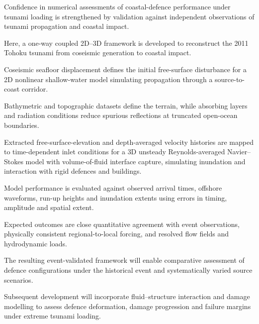 Confidence in numerical assessments of coastal-defence performance under tsunami loading is strengthened by validation against independent observations of tsunami propagation and coastal impact.

Here, a one-way coupled 2D--3D framework is developed to reconstruct the 2011 Tohoku tsunami from coseismic generation to coastal impact.

Coseismic seafloor displacement defines the initial free-surface disturbance for a 2D nonlinear shallow-water model simulating propagation through a source-to-coast corridor.

Bathymetric and topographic datasets define the terrain, while absorbing layers and radiation conditions reduce spurious reflections at truncated open-ocean boundaries.

Extracted free-surface-elevation and depth-averaged velocity histories are mapped to time-dependent inlet conditions for a 3D unsteady Reynolds-averaged Navier--Stokes model with volume-of-fluid interface capture, simulating inundation and interaction with rigid defences and buildings.

Model performance is evaluated against observed arrival times, offshore waveforms, run-up heights and inundation extents using errors in timing, amplitude and spatial extent.

Expected outcomes are close quantitative agreement with event observations, physically consistent regional-to-local forcing, and resolved flow fields and hydrodynamic loads.

The resulting event-validated framework will enable comparative assessment of defence configurations under the historical event and systematically varied source scenarios.

Subsequent development will incorporate fluid--structure interaction and damage modelling to assess defence deformation, damage progression and failure margins under extreme tsunami loading.
